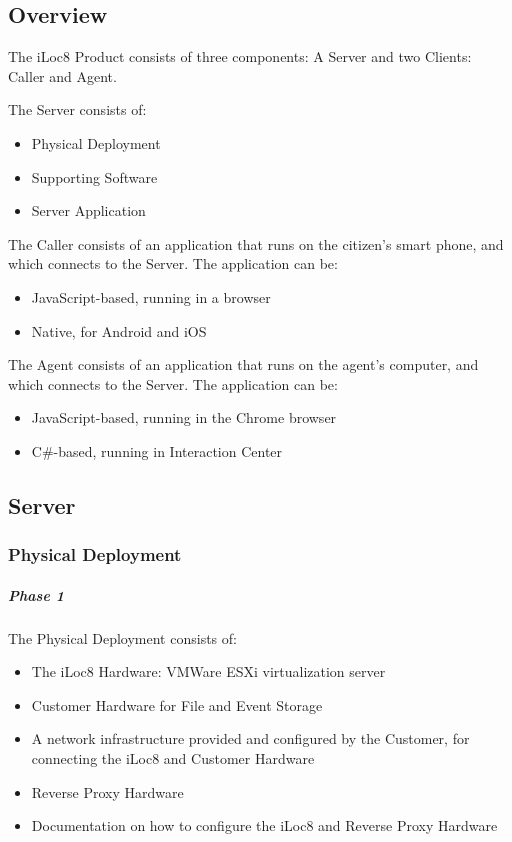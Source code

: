 \documentclass{article}
\begin{document}
	\subsection{Overview}
	
	The iLoc8 Product consists of three components: A Server and two Clients: Caller and Agent.

	The Server consists of:
	\begin{itemize}
		\item Physical Deployment
		\item Supporting Software
		\item Server Application
	\end{itemize}

	The Caller consists of an application that runs on the citizen's smart phone, and which connects to the Server. The application can be:
	\begin{itemize}
		\item JavaScript-based, running in a browser
		\item Native, for Android and iOS
	\end{itemize}
	
	The Agent consists of an application that runs on the agent's computer, and which connects to the Server. The application can be:
	\begin{itemize}
		\item JavaScript-based, running in the Chrome browser
		\item C\#-based, running in Interaction Center
	\end{itemize}

	\subsection{Server}
	
	\subsubsection{Physical Deployment}
	
	\subparagraph*{Phase 1}
	
	The Physical Deployment consists of:
	\begin{itemize}
		\item The iLoc8 Hardware: VMWare ESXi virtualization server
		\item Customer Hardware for File and Event Storage
		\item A network infrastructure provided and configured by the Customer, for connecting the iLoc8 and Customer Hardware
		\item Reverse Proxy Hardware
		\item Documentation on how to configure the iLoc8 and Reverse Proxy Hardware
	\end{itemize}
\end{document}
